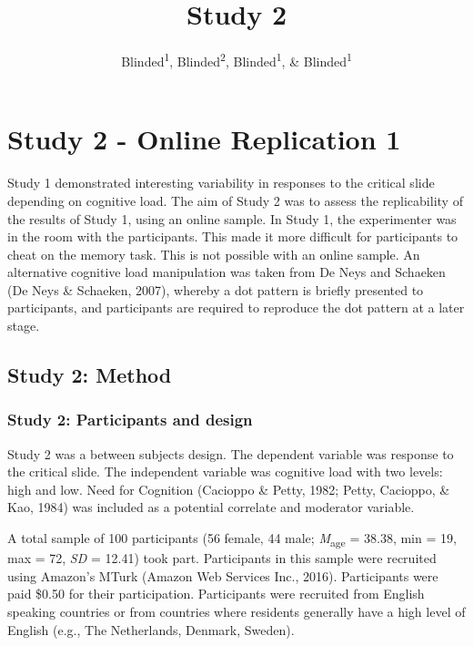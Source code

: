 \documentclass[
  american,
  man,floatsintext]{apa7}
\title{Study 2}
\author{Blinded\textsuperscript{1}, Blinded\textsuperscript{2}, Blinded\textsuperscript{1}, \& Blinded\textsuperscript{1}}
\date{}
\affiliation{\vspace{0.5cm}\textsuperscript{1} Blinded\\\textsuperscript{2} Blinded}
\begin{document}
\maketitle

\hypertarget{study-2---online-replication-1}{%
\section{Study 2 - Online Replication 1}\label{study-2---online-replication-1}}

Study 1 demonstrated interesting variability in responses to the critical slide depending on cognitive load. The aim of Study 2 was to assess the replicability of the results of Study 1, using an online sample. In Study 1, the experimenter was in the room with the participants. This made it more difficult for participants to cheat on the memory task. This is not possible with an online sample. An alternative cognitive load manipulation was taken from De Neys and Schaeken (De Neys \& Schaeken, 2007), whereby a dot pattern is briefly presented to participants, and participants are required to reproduce the dot pattern at a later stage.

\hypertarget{study-2-method}{%
\subsection{Study 2: Method}\label{study-2-method}}

\hypertarget{study-2-participants-and-design}{%
\subsubsection{Study 2: Participants and design}\label{study-2-participants-and-design}}

Study 2 was a between subjects design. The dependent variable was response to the critical slide. The independent variable was cognitive load with two levels: high and low. Need for Cognition (Cacioppo \& Petty, 1982; Petty, Cacioppo, \& Kao, 1984) was included as a potential correlate and moderator variable.

A total sample of 100 participants (56 female, 44 male; \emph{M}\textsubscript{age} = 38.38, min = 19, max = 72, \emph{SD} = 12.41) took part. Participants in this sample were recruited using Amazon's MTurk (Amazon Web Services Inc., 2016). Participants were paid \$0.50 for their participation. Participants were recruited from English speaking countries or from countries where residents generally have a high level of English (e.g., The Netherlands, Denmark, Sweden).
\end{document}
